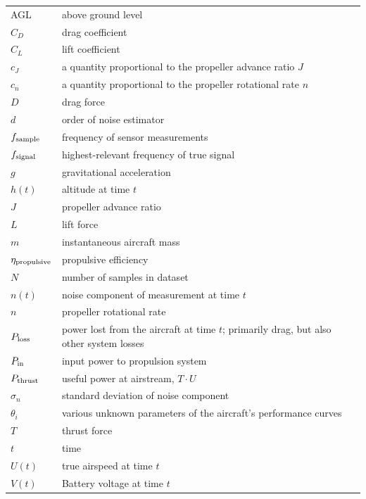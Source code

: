 \documentclass[conf]{new-aiaa}
\begin{document}
    {\renewcommand\arraystretch{1.0}
    \noindent\begin{longtable*}{@{}l @{\quad=\quad} l@{}}
                 AGL & above ground level \\
                 $C_D$ & drag coefficient \\
                 $C_L$ & lift coefficient \\
                 $c_J$ & a quantity proportional to the propeller advance ratio $J$ \\
                 $c_n$ & a quantity proportional to the propeller rotational rate $n$ \\
                 $D$ & drag force \\
                 $d$ & order of noise estimator\\
                 $f_{\rm sample}$ & frequency of sensor measurements \\
                 $f_{\rm signal}$ & highest-relevant frequency of true signal \\
                 $g$ & gravitational acceleration \\
                 $h(t)$ & altitude at time $t$ \\
                 $J$ & propeller advance ratio \\
                 $L$ & lift force \\
                 $m$ & instantaneous aircraft mass \\
                 $\eta_{\rm propulsive}$ & propulsive efficiency \\
                 $N$ & number of samples in dataset \\
                 $n(t)$ & noise component of measurement at time $t$ \\
                 $n$ & propeller rotational rate \\
                 $P_{\rm loss}$ & power lost from the aircraft at time $t$; primarily drag, but also other system losses\\
                 $P_{\rm in}$ & input power to propulsion system \\
                 $P_{\rm thrust}$ & useful power at airstream, $T \cdot U$\\
                 $\sigma_n$ & standard deviation of noise component \\
                 $\theta_i$ & various unknown parameters of the aircraft's performance curves\\
                 $T$ & thrust force \\
                 $t$ & time \\
                 $U(t)$ & true airspeed at time $t$ \\
                 $V(t)$ & Battery voltage at time $t$ \\
    \end{longtable*}}
\end{document}
